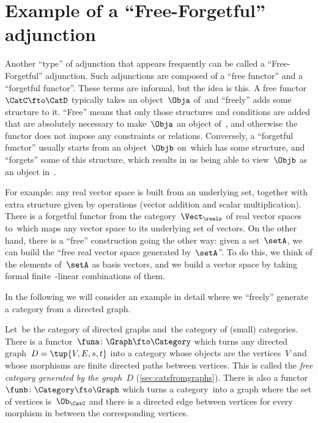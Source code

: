 
\section[Free-forgetful adjunction]{Example of a ``Free-Forgetful'' adjunction}
\label{sec:free-forgetful-adjunction-graph-example}

Another ``type'' of adjunction that appears frequently can be called a ``Free-Forgetful'' adjunction.
Such adjunctions are composed of a ``free functor'' and a ``forgetful functor''.
These terms are informal, but the idea is this.
A free functor~$\CatC \fto \CatD$ typically takes an object~$\Obja$ of~\CatC and ``freely'' adds some structure to it.
``Free'' means that only those structures and conditions are added that are absolutely necessary to make~$\Obja$ an object of~\CatD, and otherwise the functor does not impose any constraints or relations.
Conversely, a ``forgetful functor'' usually starts from an object~$\Objb$ on~\CatD which has some structure, and ``forgets'' some of this structure, which results in us being able to view~$\Objb$ as an object in~\CatC.

For example: any real vector space is built from an underlying set, together with extra structure given by operations (vector addition and scalar multiplication).
There is a forgetful functor from the category~$\Vect_{\reals}$ of real vector spaces to~\Set which maps any vector space to its underlying set of vectors.
On the other hand, there is a ``free'' construction going the other way: given a set~$\setA$, we can build the ``free real vector space generated by~$\setA$''.
To do this, we think of the elements of~$\setA$ as basis vectors, and we build a vector space by taking formal finite~\reals-linear combinations of them.

In the following we will consider an example in detail where we ``freely'' generate a category from a directed graph.

Let~\Graph be the category of directed graphs and~\Category the category of (small) categories.
There is a functor~$\funa \colon \Graph \fto \Category$ which turns any directed graph~$D = \tup{V,E, s,t}$ into a category whose objects are the vertices~$V$ and whose morphisms are finite directed paths between vertices.
This is called the \emph{free category generated by the graph~$D$} (\cref{sec:catsfromgraphs}).
There is also a functor~$\funb \colon \Category \fto \Graph$ which turns a category~\CatC into a graph where the set of vertices is~$\Ob_{\CatC}$ and there is a directed edge between vertices for every morphism in \CatC between the corresponding vertices.

